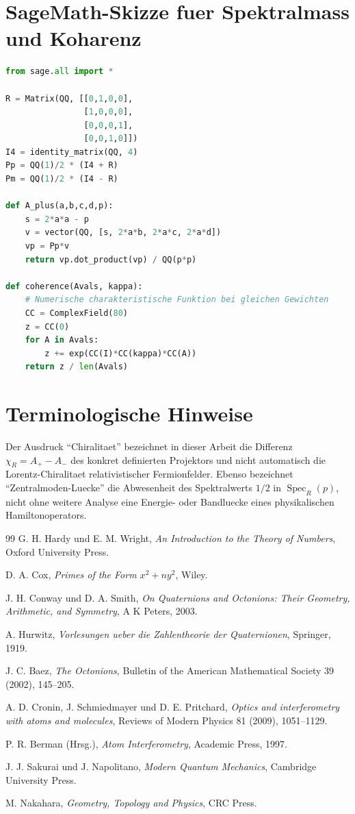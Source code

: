 \documentclass[11pt,a4paper]{article}
\theoremstyle{definition}
\newcommand{\Spec}{\operatorname{Spec}}
\begin{document}
\section{SageMath-Skizze fuer Spektralmass und Koharenz}
\begin{lstlisting}[language=Python,basicstyle=\ttfamily\small,breaklines=true]
from sage.all import *

R = Matrix(QQ, [[0,1,0,0],
                [1,0,0,0],
                [0,0,0,1],
                [0,0,1,0]])
I4 = identity_matrix(QQ, 4)
Pp = QQ(1)/2 * (I4 + R)
Pm = QQ(1)/2 * (I4 - R)

def A_plus(a,b,c,d,p):
    s = 2*a*a - p
    v = vector(QQ, [s, 2*a*b, 2*a*c, 2*a*d])
    vp = Pp*v
    return vp.dot_product(vp) / QQ(p*p)

def coherence(Avals, kappa):
    # Numerische charakteristische Funktion bei gleichen Gewichten
    CC = ComplexField(80)
    z = CC(0)
    for A in Avals:
        z += exp(CC(I)*CC(kappa)*CC(A))
    return z / len(Avals)
\end{lstlisting}

\section{Terminologische Hinweise}
Der Ausdruck \enquote{Chiralitaet} bezeichnet in dieser Arbeit die Differenz $\chi_R=A_+-A_-$ des konkret definierten Projektors und nicht automatisch die Lorentz-Chiralitaet relativistischer Fermionfelder. Ebenso bezeichnet \enquote{Zentralmoden-Luecke} die Abwesenheit des Spektralwerts $1/2$ in $\Spec_R(p)$, nicht ohne weitere Analyse eine Energie- oder Bandluecke eines physikalischen Hamiltonoperators.

\begin{thebibliography}{99}
G. H. Hardy und E. M. Wright,
\emph{An Introduction to the Theory of Numbers},
Oxford University Press.

D. A. Cox,
\emph{Primes of the Form $x^2+ny^2$},
Wiley.

J. H. Conway und D. A. Smith,
\emph{On Quaternions and Octonions: Their Geometry, Arithmetic, and Symmetry},
A K Peters, 2003.

A. Hurwitz,
\emph{Vorlesungen ueber die Zahlentheorie der Quaternionen},
Springer, 1919.

J. C. Baez,
\emph{The Octonions},
Bulletin of the American Mathematical Society 39 (2002), 145--205.

A. D. Cronin, J. Schmiedmayer und D. E. Pritchard,
\emph{Optics and interferometry with atoms and molecules},
Reviews of Modern Physics 81 (2009), 1051--1129.

P. R. Berman (Hrsg.),
\emph{Atom Interferometry},
Academic Press, 1997.

J. J. Sakurai und J. Napolitano,
\emph{Modern Quantum Mechanics},
Cambridge University Press.

M. Nakahara,
\emph{Geometry, Topology and Physics},
CRC Press.
\end{thebibliography}
\end{document}
